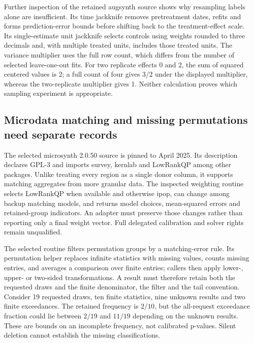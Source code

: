 Further inspection of the retained augsynth source shows why resampling
labels alone are insufficient. Its time jackknife removes pretreatment
dates, refits and forms prediction-error bounds before shifting back to
the treatment-effect scale. Its single-estimate unit jackknife selects
controls using weights rounded to three decimals and, with multiple treated
units, includes those treated units. The variance multiplier uses the full
row count, which differs from the number of selected leave-one-out fits.
For two replicate effects 0 and 2, the sum of squared centered values is 2;
a full count of four gives $3/2$ under the displayed multiplier, whereas
the two-replicate multiplier gives 1. Neither calculation proves which
sampling experiment is appropriate.~\citep{exec25_synthr_auginference,
exec25_synthr_choice}

\subsection{Microdata matching and missing permutations need separate records}
The selected microsynth 2.0.50 source is pinned to April 2025. Its description
declares GPL-3 and imports survey, kernlab and LowRankQP among other packages.
Unlike treating every region as a single donor column, it supports matching
aggregates from more granular data. The inspected weighting routine selects
LowRankQP when available and otherwise ipop, can change among backup matching
models, and returns model choices, mean-squared errors and retained-group
indicators. An adapter must preserve those changes rather than reporting
only a final weight vector. Full delegated calibration and solver rights
remain unqualified.~\citep{exec25_synthr_microsynth}

The selected routine filters permutation groups by a matching-error rule.
Its permutation helper replaces infinite statistics with missing values,
counts missing entries, and averages a comparison over finite entries;
callers then apply lower-, upper- or two-sided transformations. A result
must therefore retain both the requested draws and the finite denominator,
the filter and the tail convention. Consider 19 requested draws, ten finite
statistics, nine unknown results and two finite exceedances. The retained
frequency is $2/10$, but the all-request exceedance fraction could lie
between $2/19$ and $11/19$ depending on the unknown results. These are bounds
on an incomplete frequency, not calibrated p-values. Silent deletion cannot
establish the missing classifications.~\citep{exec25_synthr_microsynth,
exec25_synthr_choice}

